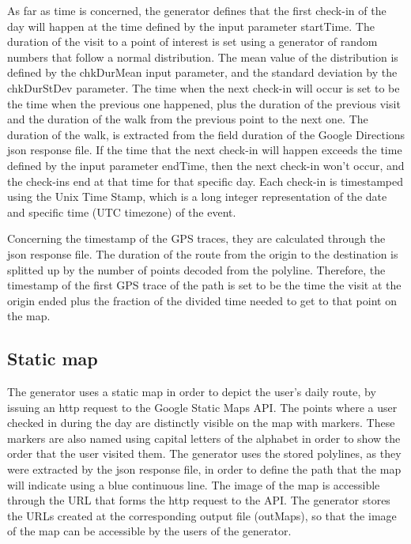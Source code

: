 As far as time is concerned, the generator defines that the first check-in of the day will happen at the time defined by the input parameter startTime. 
The duration of the visit to a point of interest is set 
using a generator of random numbers that follow a normal distribution. The mean value of the distribution is defined by the chkDurMean input parameter, and 
the standard deviation by the chkDurStDev parameter. The time when the next check-in will occur is set to be the time when the previous one happened, plus 
the duration of the previous visit and the duration of the walk from the previous point to the next one. The duration of the walk, is extracted from 
the field duration of the Google Directions json response file. If the time that the next check-in will happen exceeds the time defined by the input parameter 
endTime, then the next check-in won't occur, and the check-ins end at that time for that specific day. Each check-in is timestamped 
using the Unix Time Stamp, which is a long integer representation of the date and specific time (UTC timezone) of the event.

Concerning the timestamp of the GPS traces, they are calculated through the json response file. The duration of the route from the origin to the destination is 
splitted up by the number of points decoded from the polyline. Therefore, the timestamp of the first GPS trace of the path is set to be the time the visit 
at the origin ended plus the fraction of the divided time needed to get to that point on the map.

\subsection{Static map}

The generator uses a static map in order to depict the user's daily route, by issuing an http request to the Google Static Maps API. 
The points where a user checked in during the day are distinctly visible on the map with markers. These markers are also named using capital 
letters of the alphabet in order to show the order that the user visited them. The generator uses the stored polylines, as they were extracted by the json 
response file, in order to define the path that the map will indicate using a blue continuous line. The image of the map is accessible through the URL that 
forms the http request to the API. The generator stores the URLs created at the corresponding output file (outMaps), so that the image of the map can 
be accessible by the users of the generator.

